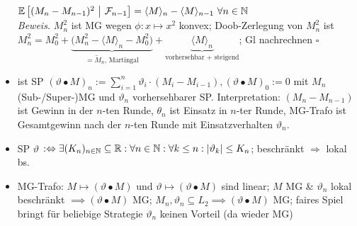 \documentclass[12pt]{scrartcl}
\begin{document}
\begin{itemize}
		$\mathbb{E}\left[(M_n-M_{n-1})^2~\big|~\mathcal{F}_{n-1}\right]=\langle M\rangle_n-\langle M\rangle_{n-1}~\forall n\in\mathbb{N}$\\
		\textit{Beweis.} $M_n^2$ ist MG wegen $\phi:x\mapsto x^2$ konvex; Doob-Zerlegung von $M_n^2$ ist\\
		$M_n^2=M_0^2+\underbrace{\big(M_n^2-\langle M\rangle_n-M_0^2\big)}_{=\tilde{M}_n\text{, Martingal}}+\underbrace{\langle M\rangle_n}_{\text{vorhersehbar + steigend}}$; Gl nachrechnen $\square$
		\item {} ist SP $(\vartheta\bullet M)_n:=\sum\limits_{i=1}^n\vartheta_i\cdot(M_i-M_{i-1}),(\vartheta\bullet M)_0:=0$
		mit $M_n$ (Sub-/Super-)MG und $\vartheta_n$ vorhersehbarer SP. Interpretation: $(M_n-M_{n-1})$ ist Gewinn in der $n$-ten Runde, $\theta_n$ ist Einsatz in $n$-ter Runde, MG-Trafo ist Gesamtgewinn nach der $n$-ten Runde mit Einsatzverhalten $\vartheta_n$.
		\item SP $\vartheta$  $:\Leftrightarrow\exists(K_n)_{n\in\mathbb{N}}\subseteq\mathbb{R}:\forall n\in\mathbb{N}:\forall k\leq n:|\vartheta_k|\leq K_n$; beschränkt $\Rightarrow$ lokal bs.
		\item MG-Trafo: $M\mapsto(\vartheta\bullet M)$ und $\vartheta\mapsto(\vartheta\bullet M)$ sind linear; $M$ MG \& $\vartheta_n$ lokal beschränkt $\implies(\vartheta\bullet M)$ MG; $M_n,\vartheta_n\subseteq L_2\implies(\vartheta\bullet M)$ MG; faires Spiel bringt für beliebige Strategie $\vartheta_n$  keinen Vorteil (da wieder MG)
	\end{itemize}
	
\end{document}
